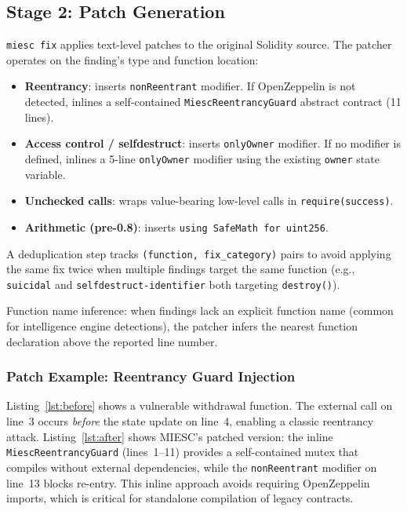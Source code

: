 \documentclass[conference]{IEEEtran}
\begin{document}
\subsection{Stage 2: Patch Generation}

\texttt{miesc fix} applies text-level patches to the original Solidity source. The patcher operates on the finding's type and function location:

\begin{itemize}
    \item \textbf{Reentrancy}: inserts \texttt{nonReentrant} modifier. If OpenZeppelin is not detected, inlines a self-contained \texttt{MiescReentrancyGuard} abstract contract (11 lines).
    \item \textbf{Access control / selfdestruct}: inserts \texttt{onlyOwner} modifier. If no modifier is defined, inlines a 5-line \texttt{onlyOwner} modifier using the existing \texttt{owner} state variable.
    \item \textbf{Unchecked calls}: wraps value-bearing low-level calls in \texttt{require(success)}.
    \item \textbf{Arithmetic (pre-0.8)}: inserts \texttt{using SafeMath for uint256}.
\end{itemize}

A deduplication step tracks \texttt{(function, fix\_category)} pairs to avoid applying the same fix twice when multiple findings target the same function (e.g., \texttt{suicidal} and \texttt{selfdestruct-identifier} both targeting \texttt{destroy()}).

Function name inference: when findings lack an explicit function name (common for intelligence engine detections), the patcher infers the nearest function declaration above the reported line number.

\subsubsection{Patch Example: Reentrancy Guard Injection}

Listing~\ref{lst:before} shows a vulnerable withdrawal function. The external call on line~3 occurs \emph{before} the state update on line~4, enabling a classic reentrancy attack. Listing~\ref{lst:after} shows MIESC's patched version: the inline \texttt{MiescReentrancyGuard} (lines~1--11) provides a self-contained mutex that compiles without external dependencies, while the \texttt{nonReentrant} modifier on line~13 blocks re-entry. This inline approach avoids requiring OpenZeppelin imports, which is critical for standalone compilation of legacy contracts.
\end{document}
